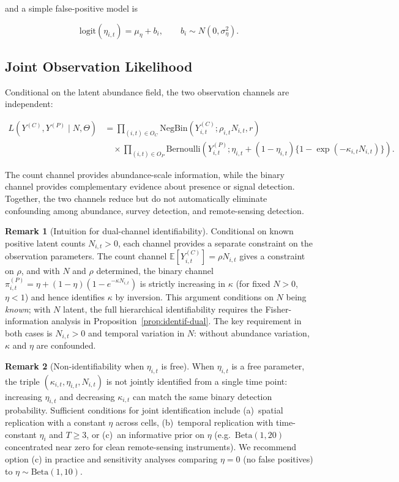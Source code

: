 \documentclass[review,12pt]{elsarticle}
\theoremstyle{definition}
\newtheorem{remark}{Remark}
\newcommand{\E}{\mathbb{E}}
\begin{document}
and a simple false-positive model is

\[
\mathrm{logit}(\eta_{i,t})
=
\mu_\eta+b_i,
\qquad
b_i\sim N(0,\sigma_\eta^2).
\]

\subsection{Joint Observation Likelihood}

Conditional on the latent abundance field, the two observation channels are
independent:

\[
\begin{aligned}
L(Y^{(C)},Y^{(P)}\mid N,\Theta)
&=
\prod_{(i,t)\in O_C}
\mathrm{NegBin}
\left(
Y^{(C)}_{i,t};
\rho_{i,t}N_{i,t},r
\right)
\\
&\quad\times
\prod_{(i,t)\in O_P}
\mathrm{Bernoulli}
\left(
Y^{(P)}_{i,t};
\eta_{i,t}
+
(1-\eta_{i,t})
\{1-\exp(-\kappa_{i,t}N_{i,t})\}
\right).
\end{aligned}
\]

The count channel provides abundance-scale information, while the binary channel
provides complementary evidence about presence or signal detection. Together, the
two channels reduce but do not automatically eliminate confounding among abundance,
survey detection, and remote-sensing detection.

\begin{remark}[Intuition for dual-channel identifiability]
\label{rem:identif-intuition}
Conditional on known positive latent counts $N_{i,t}>0$, each channel
provides a separate constraint on the observation parameters.
The count channel $\E[Y^{(C)}_{i,t}]=\rho N_{i,t}$ gives a constraint
on $\rho$, and with $N$ and $\rho$ determined, the binary channel
$\pi^{(P)}_{i,t}=\eta+(1-\eta)(1-e^{-\kappa N_{i,t}})$ is strictly
increasing in $\kappa$ (for fixed $N>0$, $\eta<1$) and hence identifies
$\kappa$ by inversion.  This argument conditions on $N$ being \emph{known};
with $N$ latent, the full hierarchical identifiability requires the
Fisher-information analysis in Proposition~\ref{prop:identif-dual}.
The key requirement in both cases is $N_{i,t}>0$ and temporal variation
in $N$: without abundance variation, $\kappa$ and $\eta$ are confounded.
\end{remark}

\begin{remark}[Non-identifiability when $\eta_{i,t}$ is free]
When $\eta_{i,t}$ is a free parameter, the triple $(\kappa_{i,t},\eta_{i,t},N_{i,t})$
is not jointly identified from a single time point: increasing $\eta_{i,t}$ and
decreasing $\kappa_{i,t}$ can match the same binary detection probability.
Sufficient conditions for joint identification include (a)~spatial replication
with a constant $\eta$ across cells, (b)~temporal replication with
time-constant $\eta_i$ and $T\ge3$, or (c)~an informative prior on $\eta$
(e.g.\ $\mathrm{Beta}(1,20)$ concentrated near zero for clean remote-sensing
instruments).  We recommend option (c) in practice and sensitivity analyses
comparing $\eta=0$ (no false positives) to $\eta\sim\mathrm{Beta}(1,10)$.
\end{remark}
\end{document}
